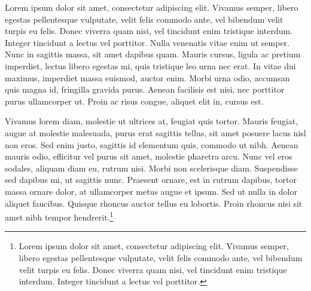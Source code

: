 \label{anex:lorem1}

Lorem ipsum dolor sit amet, consectetur adipiscing elit. Vivamus semper, libero egestas pellentesque vulputate, velit felis commodo ante, vel bibendum velit turpis eu felis. Donec viverra quam nisi, vel tincidunt enim tristique interdum. Integer tincidunt a lectus vel porttitor. Nulla venenatis vitae enim ut semper. Nunc in sagittis massa, sit amet dapibus quam. Mauris cursus, ligula ac pretium imperdiet, lectus libero egestas mi, quis tristique leo urna nec erat. In vitae dui maximus, imperdiet massa euismod, auctor enim. Morbi urna odio, accumsan quis magna id, fringilla gravida purus. Aenean facilisis est nisi, nec porttitor purus ullamcorper ut. Proin ac risus congue, aliquet elit in, cursus est.

Vivamus lorem diam, molestie ut ultrices at, feugiat quis tortor. Mauris feugiat, augue at molestie malesuada, purus erat sagittis tellus, sit amet posuere lacus nisl non eros. Sed enim justo, sagittis id elementum quis, commodo ut nibh. Aenean mauris odio, efficitur vel purus sit amet, molestie pharetra arcu. Nunc vel eros sodales, aliquam diam eu, rutrum nisi. Morbi non scelerisque diam. Suspendisse sed dapibus mi, ut sagittis nunc. Praesent ornare, est in rutrum dapibus, tortor massa ornare dolor, at ullamcorper metus augue et ipsum. Sed ut nulla in dolor aliquet faucibus. Quisque rhoncus auctor tellus eu lobortis. Proin rhoncus nisi sit amet nibh tempor hendrerit.\footnote{Lorem ipsum dolor sit amet, consectetur adipiscing elit. Vivamus semper, libero egestas pellentesque vulputate, velit felis commodo ante, vel bibendum velit turpis eu felis. Donec viverra quam nisi, vel tincidunt enim tristique interdum. Integer tincidunt a lectus vel porttitor.}